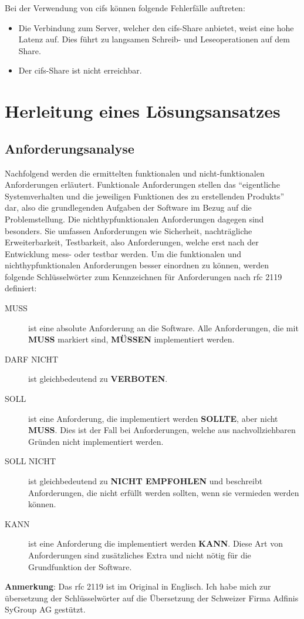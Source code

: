 \documentclass[titlepage]{report}
\begin{document}
Bei der Verwendung von \gls{cifs} können folgende Fehlerfälle auftreten:
\begin{itemize}
    \item Die Verbindung zum Server, welcher den \gls{cifs}\hyp{}Share
          anbietet, weist eine hohe Latenz auf. Dies führt zu langsamen
          Schreib\hyp{} und Leseoperationen auf dem Share.
    \item Der \gls{cifs}\hyp{}Share ist nicht erreichbar.
\end{itemize}
\chapter{Herleitung eines Lösungsansatzes}
\section{Anforderungsanalyse}
Nachfolgend werden die ermittelten funktionalen und nicht\hyp{}funktionalen
Anforderungen erläutert. Funktionale Anforderungen stellen das
``eigentliche Systemverhalten und die jeweiligen Funktionen des zu
erstellenden Produkts''\cite[S. 20]{BPSE} dar, also die grundlegenden
Aufgaben der Software im Bezug auf die Problemstellung. Die
nichthyp{}funktionalen Anforderungen dagegen sind besonders. Sie umfassen
Anforderungen wie Sicherheit, nachträgliche Erweiterbarkeit,
Testbarkeit, also Anforderungen, welche erst nach der Entwicklung
mess\hyp{} oder testbar werden\cite[S. 292]{SNFA}. Um die funktionalen
und nichthyp{}funktionalen Anforderungen besser einordnen zu können, werden
folgende Schlüsselwörter zum Kennzeichnen für Anforderungen nach
\gls{rfc} 2119\cite{RFC2119} definiert:
\begin{description}
    \item[MUSS] ist eine absolute Anforderung an die Software. Alle
        Anforderungen, die mit \textbf{MUSS} markiert sind,
        \textbf{MÜSSEN} implementiert werden.
    \item[DARF NICHT] ist gleichbedeutend zu \textbf{VERBOTEN}.
    \item[SOLL] ist eine Anforderung, die implementiert werden
        \textbf{SOLLTE}, aber nicht \textbf{MUSS}. Dies ist der Fall bei
        Anforderungen, welche aus nachvollziehbaren Gründen nicht
        implementiert werden.
    \item[SOLL NICHT] ist gleichbedeutend zu \textbf{NICHT EMPFOHLEN}
        und beschreibt Anforderungen, die nicht erfüllt werden sollten,
        wenn sie vermieden werden können.
    \item[KANN] ist eine Anforderung die implementiert werden
        \textbf{KANN}. Diese Art von Anforderungen sind
        zusätzliches Extra und nicht nötig für die Grundfunktion der
        Software.
\end{description}
\textbf{Anmerkung}: Das \gls{rfc} 2119 ist im Original in Englisch. Ich
habe mich zur übersetzung der Schlüsselwörter auf die Übersetzung der
Schweizer Firma Adfinis SyGroup AG gestützt\cite{RFC2119DE}.
\end{document}
